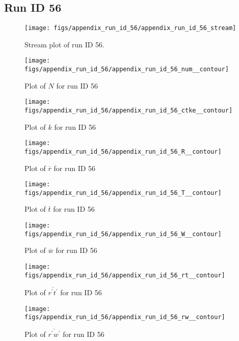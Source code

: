 \subsection{Run ID 56}
\begin{figure}[H]
\centering
\texttt{[image: figs/appendix\_run\_id\_56/appendix\_run\_id\_56\_stream]}
\caption{Stream plot of run ID 56.}
\label{fig:appendix_run_id_56_stream}
\end{figure}


\begin{figure}[H]
\centering
\texttt{[image: figs/appendix\_run\_id\_56/appendix\_run\_id\_56\_num\_\_contour]}
\caption{Plot of $N$ for run ID 56}
\label{fig:appendix_run_id_56_num__contour}
\end{figure}


\begin{figure}[H]
\centering
\texttt{[image: figs/appendix\_run\_id\_56/appendix\_run\_id\_56\_ctke\_\_contour]}
\caption{Plot of $k$ for run ID 56}
\label{fig:appendix_run_id_56_ctke__contour}
\end{figure}


\begin{figure}[H]
\centering
\texttt{[image: figs/appendix\_run\_id\_56/appendix\_run\_id\_56\_R\_\_contour]}
\caption{Plot of $\overline{r}$ for run ID 56}
\label{fig:appendix_run_id_56_R__contour}
\end{figure}


\begin{figure}[H]
\centering
\texttt{[image: figs/appendix\_run\_id\_56/appendix\_run\_id\_56\_T\_\_contour]}
\caption{Plot of $\overline{t}$ for run ID 56}
\label{fig:appendix_run_id_56_T__contour}
\end{figure}


\begin{figure}[H]
\centering
\texttt{[image: figs/appendix\_run\_id\_56/appendix\_run\_id\_56\_W\_\_contour]}
\caption{Plot of $\overline{w}$ for run ID 56}
\label{fig:appendix_run_id_56_W__contour}
\end{figure}


\begin{figure}[H]
\centering
\texttt{[image: figs/appendix\_run\_id\_56/appendix\_run\_id\_56\_rt\_\_contour]}
\caption{Plot of $\overline{r^\prime t^\prime}$ for run ID 56}
\label{fig:appendix_run_id_56_rt__contour}
\end{figure}


\begin{figure}[H]
\centering
\texttt{[image: figs/appendix\_run\_id\_56/appendix\_run\_id\_56\_rw\_\_contour]}
\caption{Plot of $\overline{r^\prime w^\prime}$ for run ID 56}
\label{fig:appendix_run_id_56_rw__contour}
\end{figure}


